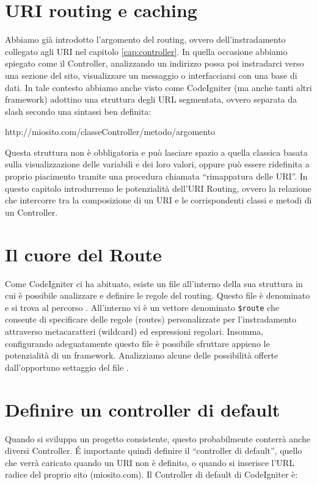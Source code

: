 \section{URI routing e caching}
\label{cap:uri}

Abbiamo già introdotto l'argomento del routing, ovvero dell'instradamento collegato agli \ac{URI} nel capitolo \vref{cap:controller}. In quella occasione abbiamo spiegato come il Controller, analizzando un indirizzo possa poi instradarci verso una sezione del sito, visualizzare un messaggio o interfacciarsi con una base di dati. In tale contesto abbiamo anche visto come CodeIgniter (ma anche tanti altri framework) adottino una struttura degli \ac{URL} segmentata, ovvero separata da slash secondo una sintassi ben definita:

\begin{code}
http://miosito.com/classeController/metodo/argomento
\end{code}

Questa struttura non è obbligatoria e può lasciare spazio a quella classica basata sulla visualizzazione delle variabili e dei loro valori, oppure può essere ridefinita a proprio piacimento tramite una procedura chiamata ``rimappatura delle \ac{URI}''. In questo capitolo introdurremo le potenzialità dell'URI Routing, ovvero la relazione che intercorre tra la composizione di un \ac{URI} e le corrispondenti classi e metodi di un Controller.

\section*{Il cuore del Route}
Come CodeIgniter ci ha abituato, esiste un file all'interno della sua struttura in cui è possibile analizzare e definire le regole del routing. Questo file è denominato  e si trova al percorso . All'interno vi è un vettore denominato \verb|$route| che consente di specificare delle regole (routes) personalizzate per l'instradamento attraverso metacaratteri (wildcard) ed espressioni regolari. Insomma, configurando adeguatamente questo file è possibile sfruttare appieno le potenzialità di un framework. Analizziamo alcune delle possibilità offerte dall'opportuno settaggio del file .

\section*{Definire un controller di default}
Quando si sviluppa un progetto consistente, questo probabilmente conterrà anche diversi Controller. \'E importante quindi definire il ``controller di default'', quello che verrà caricato quando un \ac{URI} non è definito, o quando si inserisce l'\ac{URL} radice del proprio sito (miosito.com). Il Controller di default di CodeIgniter è:

